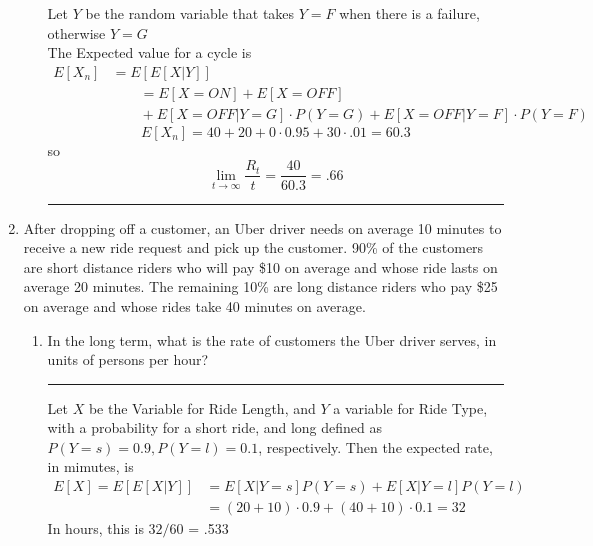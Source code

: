 \documentclass{article} %
\theoremstyle{plain}
\theoremstyle{case}
\begin{document}
\begin{enumerate}[label={\fbox{\textbf{Exercise \#\arabic* :}}}]
\begin{enumerate}
        Let $Y$ be the random variable that takes $Y=F$ when there is a
        failure, otherwise $Y=G$\\
       The Expected value for a cycle is
       \begin{equation*}\begin{split}
         E[X_n] &= E[E[X|Y]] \\
                &\qquad = E[X=ON] + E[X=OFF] \\
                    &\qquad + E[X=OFF|Y=G] \cdot P(Y=G) 
                            + E[X=OFF|Y=F] \cdot P(Y=F)
       \end{split}\end{equation*}
       \[ E[X_n] = 40 + 20  + 0 \cdot 0.95 + 30 \cdot .01 = 60.3 \]
       so
       \[ \lim_{t \to \infty} \frac{R_t}{t} = \frac{40}{60.3} = .66 \]
\par\noindent\rule{\textwidth}{0.1pt}
    \end{enumerate}
  \newpage
  \item After dropping off a customer, an Uber driver needs on average 10
    minutes to receive a new ride request and pick up the customer.
    90\% of the customers are short distance riders who will pay
    \$10 on average and whose ride lasts on average 20 minutes.
    The remaining 10\% are long distance riders who pay \$25 on
    average and whose rides take 40 minutes on average.
    \begin{enumerate}
      \item In the long term, what is the rate of customers the Uber driver serves, in units of persons per hour?
\par\noindent\rule{\textwidth}{0.1pt}
        Let $X$ be the Variable for Ride Length, and $Y$ a variable for
        Ride Type, with a probability for a short ride, and long 
        defined as $P(Y=s) = 0.9, P(Y=l) = 0.1$, respectively.  Then
        the expected rate, in mimutes, is
       \begin{align*}
         E[X] = E[E[X|Y]] &= E[X|Y=s]P(Y=s) + E[X|Y=l]P(Y=l)   \\
                          &= (20+10) \cdot 0.9 + (40+10) \cdot 0.1 = 32
       \end{align*}
       In hours, this is $32/60$ = .533


\end{enumerate}
\end{enumerate}
\end{document}
